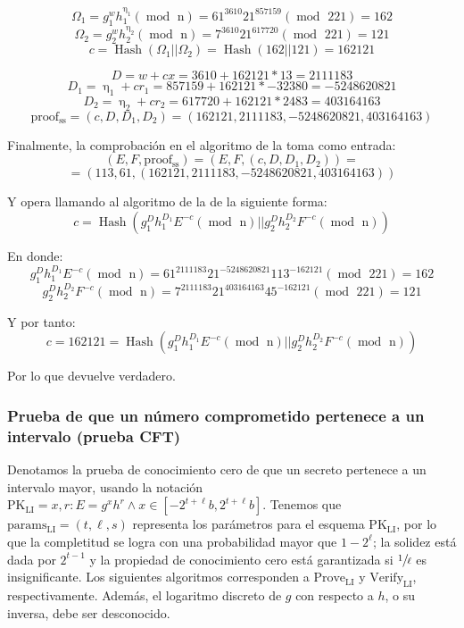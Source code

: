 $$\Omega_{1} = g_{1}^{w}h_{1}^{\upeta_{1}} (\operatorname{mod} \text{ n}) = 61^{3610}21^{857159} (\operatorname{mod} \text{ 221}) = 162$$
$$\Omega_{2} = g_{2}^{w}h_{2}^{\upeta_{2}} (\operatorname{mod} \text{ n}) = 7^{3610}21^{617720} (\operatorname{mod} \text{ 221}) = 121$$
$$c = \operatorname{Hash}(\Omega_{1}||\Omega_{2}) = \operatorname{Hash}(162||121) = 162121$$

$$D = w + cx = 3610 + 162121 * 13 = 2111183$$
$$D_{1} = \upeta_{1} + cr_{1} = 857159 + 162121 * -32380 = -5248620821$$
$$D_{2} = \upeta_{2} + cr_{2} = 617720 + 162121 * 2483 = 403164163$$
$$\operatorname{proof_{ss}} = (c, D, D_{1}, D_{2}) = (162121, 2111183, -5248620821, 403164163)$$

Finalmente, la comprobación en el algoritmo de la  toma como entrada:
$$(E, F, \operatorname{proof_{ss}}) = (E, F, (c, D, D_{1}, D_{2})) =$$ $$= (113, 61, (162121, 2111183, -5248620821, 403164163))$$

Y opera llamando al algoritmo de la  de la siguiente forma:
$$c = \operatorname{Hash}(g_{1}^{D}h_{1}^{D_{1}}E^{-c} (\operatorname{mod} \text{ n}) || g_{2}^{D}h_{2}^{D_{2}}F^{-c} (\operatorname{mod} \text{ n}))$$

En donde:
$$g_{1}^{D}h_{1}^{D_{1}}E^{-c} (\operatorname{mod} \text{ n}) = 61^{2111183}21^{-5248620821}113^{-162121} (\operatorname{mod} \text{ 221}) = 162$$
$$g_{2}^{D}h_{2}^{D_{2}}F^{-c} (\operatorname{mod} \text{ n}) = 7^{2111183}21^{403164163}45^{-162121} (\operatorname{mod} \text{ 221}) = 121$$

Y por tanto:
$$c = 162121 = \operatorname{Hash}(g_{1}^{D}h_{1}^{D_{1}}E^{-c} (\operatorname{mod} \text{ n}) || g_{2}^{D}h_{2}^{D_{2}}F^{-c} (\operatorname{mod} \text{ n}))$$

Por lo que devuelve verdadero.    

\subsubsection{Prueba de que un número comprometido pertenece a un intervalo (prueba CFT)}  \label{proof:li}

Denotamos la prueba de conocimiento cero de que un secreto pertenece a un intervalo mayor, usando la notación $\operatorname{PK_{LI}} = {x, r: E = g^{x} h^{r} \wedge x \in [-2^{t+\ell}b, 2^{t+\ell}b]}$. Tenemos que $\operatorname{params_{LI}} = (t, \ell, s)$ representa los parámetros para el esquema $\operatorname{PK_{LI}}$, por lo que la completitud se logra con una probabilidad mayor que $1 - 2^{\ell}$; la solidez está dada por $2^{t-1}$ y la propiedad de conocimiento cero está garantizada si $\sfrac{1}{\ell}$ es insignificante. Los siguientes algoritmos corresponden a $\operatorname{Prove_{LI}}$ y $\operatorname{Verify_{LI}}$, respectivamente. Además, el logaritmo discreto de $g$ con respecto a $h$, o su inversa, debe ser desconocido.

